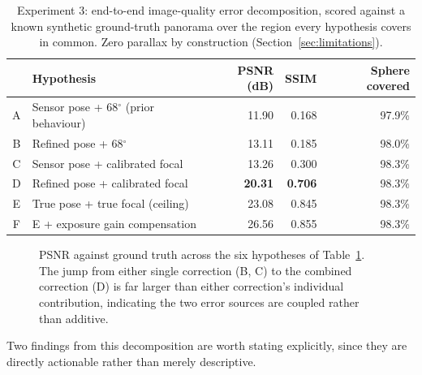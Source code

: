 \documentclass[11pt]{article}
\newcommand{\Deg}{\ensuremath{^{\circ}}}
\begin{document}
\begin{table}[h]
\centering
\small
\begin{tabular}{@{}clrrr@{}}
\toprule
& \textbf{Hypothesis} & \textbf{PSNR (dB)} & \textbf{SSIM} & \textbf{Sphere covered} \\
\midrule
A & Sensor pose + $68\Deg$ (prior behaviour) & 11.90 & 0.168 & 97.9\% \\
B & Refined pose + $68\Deg$ & 13.11 & 0.185 & 98.0\% \\
C & Sensor pose + calibrated focal & 13.26 & 0.300 & 98.3\% \\
D & Refined pose + calibrated focal & \textbf{20.31} & \textbf{0.706} & 98.3\% \\
E & True pose + true focal (ceiling) & 23.08 & 0.845 & 98.3\% \\
F & E + exposure gain compensation & 26.56 & 0.855 & 98.3\% \\
\bottomrule
\end{tabular}
\caption{Experiment 3: end-to-end image-quality error decomposition, scored against a known synthetic ground-truth panorama over the region every hypothesis covers in common. Zero parallax by construction (Section~\ref{sec:limitations}).}
\label{tab:exp3}
\end{table}

\begin{figure}[h]
\centering
{}
\caption{PSNR against ground truth across the six hypotheses of Table~\ref{tab:exp3}. The jump from either single correction (B, C) to the combined correction (D) is far larger than either correction's individual contribution, indicating the two error sources are coupled rather than additive.}
\label{fig:decomposition}
\end{figure}

Two findings from this decomposition are worth stating explicitly, since they are directly actionable rather than merely descriptive.
\end{document}
